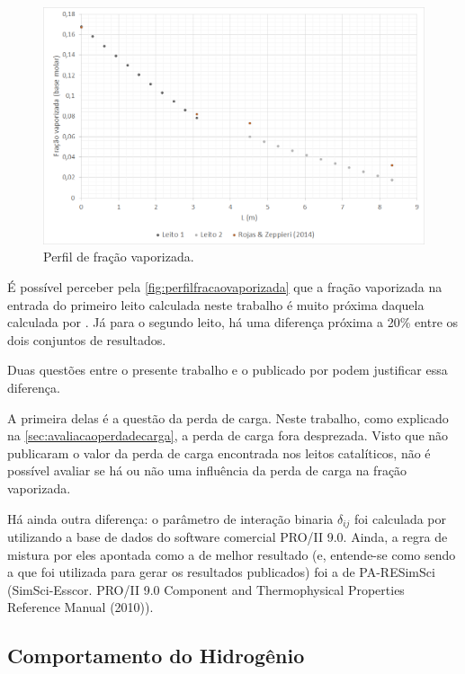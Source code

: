 \begin{figure}[htb]
\centering \includegraphics[scale=0.4]{images/Chap4/perfilfracaovaporizada.png}
\caption{Perfil de fração vaporizada.}
\label{fig:perfilfracaovaporizada}
\end{figure}

É possível perceber pela \autoref{fig:perfilfracaovaporizada} que a fração
vaporizada na entrada do primeiro leito calculada neste trabalho é muito próxima
daquela calculada por . Já para o segundo leito, há uma
diferença próxima a 20\% entre os dois conjuntos de resultados.

Duas questões entre o presente trabalho e o publicado por
 podem justificar essa diferença.

A primeira delas é a questão da perda de carga. Neste trabalho, como explicado
na \autoref{sec:avaliacaoperdadecarga}, a perda de carga fora desprezada. Visto
que  não publicaram o valor da perda de carga encontrada nos
leitos catalíticos, não é possível avaliar se há ou não uma influência da perda
de carga na fração vaporizada.

Há ainda outra diferença: o parâmetro de interação binaria $\delta_{ij}$ foi
calculada por  utilizando a base de dados do software
comercial PRO/II 9.0. Ainda, a regra de mistura por eles apontada como a de melhor resultado (e,
entende-se como sendo a que foi utilizada para gerar os resultados publicados)
foi a de PA-RESimSci (SimSci-Esscor. PRO/II 9.0 Component and Thermophysical
Properties Reference Manual (2010)).

\subsection{Comportamento do Hidrogênio} \label{comportamentodohidrogenio}

